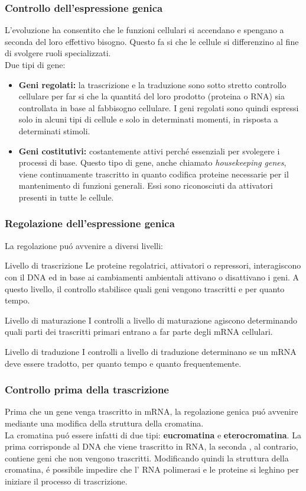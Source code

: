 \documentclass[hyperref={pdfpagelabels=false}]{beamer}
\begin{document}
\begin{frame}\frametitle{Controllo dell'espressione genica}
L'evoluzione ha consentito che le funzioni cellulari si accendano e spengano a seconda del loro effettivo bisogno. Questo fa si che le cellule si differenzino al fine di svolgere ruoli specializzati.
\\
Due tipi di gene:
\begin{itemize}
\item \textbf{Geni regolati:} la trascrizione e la traduzione sono sotto stretto controllo cellulare per far si che la quantit\'a del loro prodotto (proteina o RNA) sia controllata in base al fabbisogno cellulare. I geni regolati sono quindi espressi solo in alcuni tipi di cellule e solo in determinati momenti, in risposta a determinati stimoli.
\item \textbf{Geni costitutivi:} costantemente attivi perch\'e essenziali per svolegere i processi di base. Questo tipo di gene, anche chiamato \emph{housekeeping genes}, viene continuamente trascritto in quanto codifica proteine necessarie per il mantenimento di funzioni generali. Essi sono riconosciuti da attivatori  presenti in tutte le 
cellule.
\end{itemize}
\end{frame}


\begin{frame}\frametitle{Regolazione dell'espressione genica}
La regolazione pu\'o avvenire a diversi livelli:
\begin{block}{Livello di trascrizione}
Le proteine regolatrici, attivatori o repressori, interagiscono con il DNA ed in base ai cambiamenti ambientali attivano o disattivano i geni. A questo livello, il controllo stabilisce quali geni vengono trascritti e per quanto tempo.
\end{block}
\begin{block}{Livello di maturazione}
I controlli a livello di maturazione agiscono determinando quali parti dei trascritti primari entrano a far parte degli mRNA cellulari.
\end{block}
\begin{block}{Livello di traduzione}
I controlli a livello di traduzione determinano se un mRNA deve essere tradotto, per quanto tempo e quanto frequentemente.
\end{block}
\end{frame}


\begin{frame}\frametitle{Controllo prima della trascrizione}
 Prima che un gene venga trascritto in mRNA, la regolazione genica pu\'o avvenire mediante una modifica della struttura della cromatina.\\
 La cromatina pu\'o essere infatti di due tipi: \textbf{eucromatina} e \textbf{eterocromatina}. La prima corrisponde al DNA che viene trascritto in RNA, la seconda , al contrario, contiene geni che non vengono trascritti.
 Modificando quindi la struttura della cromatina, \'e possibile impedire che l' RNA polimerasi e le proteine si leghino per iniziare il processo di trascrizione.
\end{frame}
\end{document}
